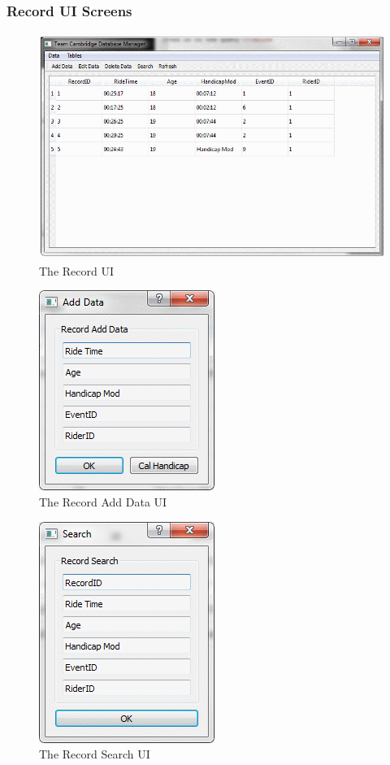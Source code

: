 \begin{landscape}
\subsubsection{Record UI Screens}

\begin{figure}[H]
\includegraphics{./Maintenance/UI/Record.png}
\caption{The Record UI} \label{fig:Record_UI}
\end{figure}
\end{landscape}
\begin{figure}[H]
\includegraphics{./Maintenance/UI/RecordAD.png}
\caption{The Record Add Data UI} \label{fig:RecordAD_UI}
\end{figure}

\begin{figure}[H]
\includegraphics{./Maintenance/UI/RecordSearch.png}
\caption{The Record Search UI} \label{fig:RecordSearch_UI}
\end{figure}


